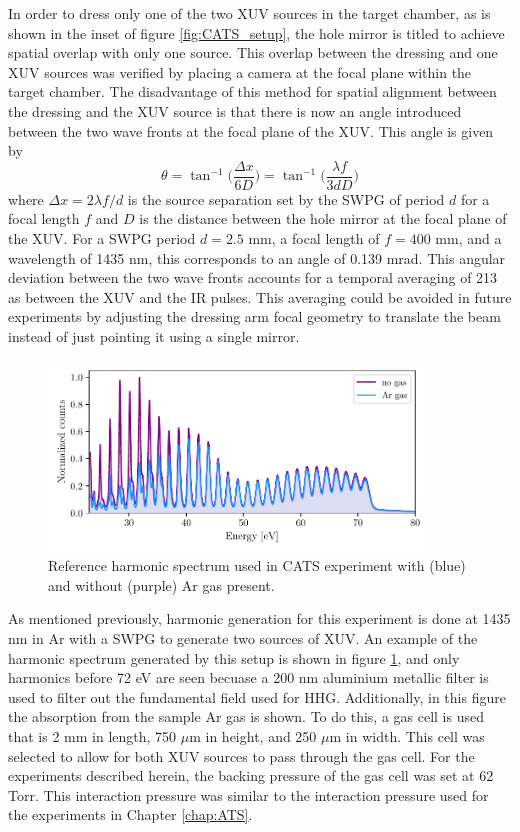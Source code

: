 In order to dress only one of the two XUV sources in the target chamber, as is shown in the inset of figure \ref{fig:CATS_setup}, the hole mirror is titled to achieve spatial overlap with only one source.  This overlap between the dressing and one XUV sources was verified by placing a camera at the focal plane within the target chamber.  The disadvantage of this method for spatial alignment between the dressing and the XUV source is that there is now an angle introduced between the two wave fronts at the focal plane of the XUV.  This angle is given by
\begin{equation}
	\theta = \tan^{-1}\bigg(\frac{\Delta x}{6 D}\bigg) = \tan^{-1}\bigg(\frac{\lambda f}{3 d D}\bigg)
\end{equation}
where $\Delta x = 2\lambda f /d$ is the source separation set by the SWPG of period $d$ for a focal length $f$ and $D$ is the distance between the hole mirror at the focal plane of the XUV. For a SWPG period $d=2.5$ mm, a focal length of $f=400$ mm, and a wavelength of 1435 nm, this corresponds to an angle of 0.139 mrad.  This angular deviation between the two wave fronts accounts for a temporal averaging of 213 as between the XUV and the IR pulses.  This averaging could be avoided in future experiments by adjusting the dressing arm focal geometry to translate the beam instead of just pointing it using a single mirror.

\begin{figure}
	\centering
	\includegraphics[width=0.9\textwidth]{figures/CATS/ref_harmonic_spectrum.pdf}
	\caption[Reference harmonic spectrum used in CATS experiment]{Reference harmonic spectrum used in CATS experiment with (blue) and without (purple) Ar gas present.}
	\label{fig:ref_harmonic_spectrum}
\end{figure}

As mentioned previously, harmonic generation for this experiment is done at 1435 nm in Ar with a SWPG to generate two sources of XUV.  An example of the harmonic spectrum generated by this setup is shown in figure \ref{fig:ref_harmonic_spectrum}, and only harmonics before 72 eV are seen becuase a 200 nm aluminium metallic filter is used to filter out the fundamental field used for HHG.  Additionally, in this figure the absorption from the sample Ar gas is shown. To do this, a gas cell is used that is 2 mm in length, 750 $\mu$m in height, and 250 $\mu$m in width.  This cell was selected to allow for both XUV sources to pass through the gas cell.  For the experiments described herein, the backing pressure of the gas cell was set at 62 Torr.  This interaction pressure was similar to the interaction pressure used for the experiments in Chapter \ref{chap:ATS}.


